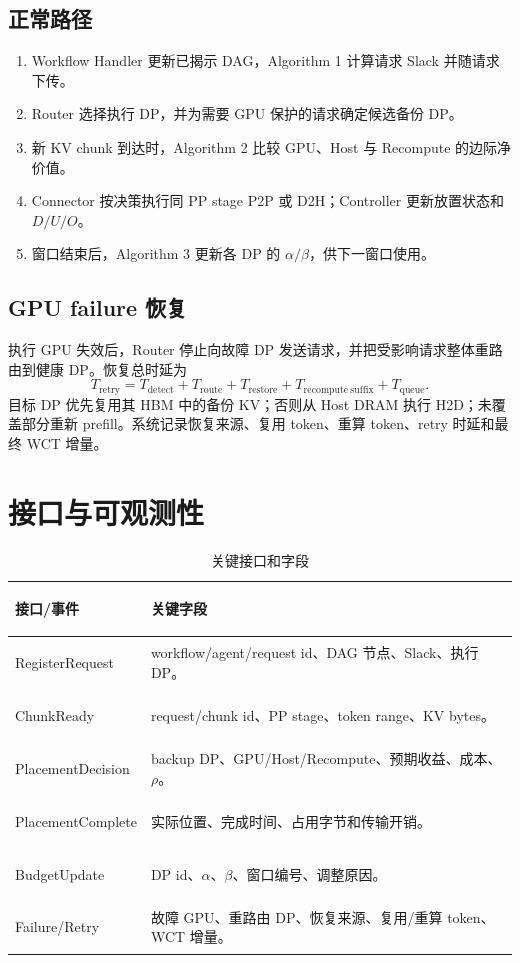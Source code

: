 \documentclass[UTF8,11pt,a4paper]{ctexart}
\begin{document}
\subsection{正常路径}

\begin{enumerate}
  \item Workflow Handler 更新已揭示 DAG，Algorithm 1 计算请求 Slack 并随请求下传。
  \item Router 选择执行 DP，并为需要 GPU 保护的请求确定候选备份 DP。
  \item 新 KV chunk 到达时，Algorithm 2 比较 GPU、Host 与 Recompute 的边际净价值。
  \item Connector 按决策执行同 PP stage P2P 或 D2H；Controller 更新放置状态和 $D/U/O$。
  \item 窗口结束后，Algorithm 3 更新各 DP 的 $\alpha/\beta$，供下一窗口使用。
\end{enumerate}

\subsection{GPU failure 恢复}

执行 GPU 失效后，Router 停止向故障 DP 发送请求，并把受影响请求整体重路由到健康
DP。恢复总时延为
\begin{equation}
  T_{\mathrm{retry}}
  =T_{\mathrm{detect}}+T_{\mathrm{route}}
  +T_{\mathrm{restore}}+T_{\mathrm{recompute\ suffix}}
  +T_{\mathrm{queue}}.
  \label{eq:retry}
\end{equation}
目标 DP 优先复用其 HBM 中的备份 KV；否则从 Host DRAM 执行 H2D；未覆盖部分重新
prefill。系统记录恢复来源、复用 token、重算 token、retry 时延和最终 WCT 增量。

\section{接口与可观测性}

\begin{table}[H]
  \centering
  \caption{关键接口和字段}
  \begin{tabularx}{\textwidth}{>{\bfseries\raggedright\arraybackslash}p{4.2cm}X}
    \toprule
    接口/事件 & 关键字段 \\
    \midrule
    RegisterRequest & workflow/agent/request id、DAG 节点、Slack、执行 DP。 \\
    ChunkReady & request/chunk id、PP stage、token range、KV bytes。 \\
    PlacementDecision & backup DP、GPU/Host/Recompute、预期收益、成本、$\rho$。 \\
    PlacementComplete & 实际位置、完成时间、占用字节和传输开销。 \\
    BudgetUpdate & DP id、$\alpha$、$\beta$、窗口编号、调整原因。 \\
    Failure/Retry & 故障 GPU、重路由 DP、恢复来源、复用/重算 token、WCT 增量。 \\
    \bottomrule
  \end{tabularx}
\end{table}
\end{document}
